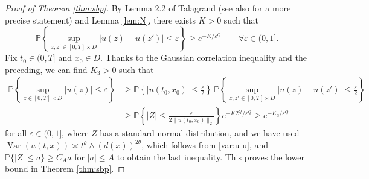\documentclass[reqno]{amsart}
\DeclareMathOperator{\Var}{Var}
\renewcommand{\P}{\mathbb P}
\newcommand{\1}{\mathbf 1}
\numberwithin{equation}{section}
\theoremstyle{definition}
\begin{document}
\begin{proof}[Proof of Theorem \ref{thm:sbp}]
By Lemma 2.2 of Talagrand \cite{Talagrand} (see also \cite[Lemma 3.4]{DLMX} for a more precise statement) and Lemma \ref{lem:N}, there exists $K>0$ such that 
\[
	\P\left\{ \sup_{z,z' \in [0,T]\times D}|u(z)-u(z')| \le \varepsilon \right\} \ge e^{-K/\varepsilon^Q}\qquad
	\forall \varepsilon \in (0,1].
\]
Fix $t_0 \in (0,T]$ and $x_0 \in D$.
Thanks to the Gaussian correlation inequality and the preceding, we can find $K_3>0$ such that
\begin{align*}
	\P\left\{ \sup_{z \in [0,T]\times D}|u(z)| \le \varepsilon \right\}
	&\ge \P\left\{ |u(t_0,x_0)| \le \frac{\varepsilon}{2} \right\} \, \P\left\{ \sup_{z,z' \in [0,T]\times D}|u(z)-u(z')| \le \frac{\varepsilon}{2} \right\} \\
	& \ge \P\left\{ |Z| \le \frac{\varepsilon}{2\|u(t_0,x_0)\|_2} \right\} e^{-K2^Q/\varepsilon^Q}
	\ge e^{-K_3/\varepsilon^Q}
\end{align*}
for all $\varepsilon \in (0,1]$, where $Z$ has a standard normal distribution, and we have used $\Var(u(t,x)) \asymp t^{\theta} \wedge (d(x))^{2\theta}$, which follows from  \eqref{var:u-u}, and $\P\{|Z| \le a \} \ge C_A a$ for $|a| \le A$ to obtain the last inequality. This proves the lower bound in Theorem \ref{thm:sbp}.


\end{proof}
\end{document}
